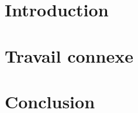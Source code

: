 \section{Introduction}
\vspace{0.2in}
\hspace*{0.16in}

\section{Travail connexe}
\vspace{0.2in}
\hspace*{0.16in}

\section{Conclusion}
\vspace{0.1in}
\hspace*{0.16in}
